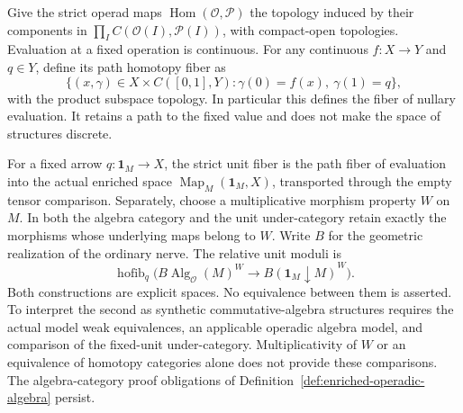 \begin{definition}
  \label{def:strict-operadic-structure-space}
  \leanok
  Give the strict operad maps $\operatorname{Hom}(\mathcal O,\mathcal P)$
  the topology induced by their components in
  $\prod_I C(\mathcal O(I),\mathcal P(I))$, with compact-open topologies.
  Evaluation at a fixed operation is continuous. For any continuous
  $f:X\to Y$ and $q\in Y$, define its path homotopy fiber as
  \[
    \{(x,\gamma)\in X\times C([0,1],Y):
       \gamma(0)=f(x),\ \gamma(1)=q\},
  \]
  with the product subspace topology. In particular this defines the
  fiber of nullary evaluation. It retains a path to the fixed value and
  does not make the space of structures discrete.
\end{definition}

\begin{definition}
  \label{def:operadic-unit-spaces}
  For a fixed arrow $q:\mathbf1_M\to X$, the strict unit fiber is the
  path fiber of evaluation into the actual enriched space
  $\operatorname{Map}_M(\mathbf1_M,X)$, transported through the empty
  tensor comparison.
  Separately, choose a multiplicative morphism property $W$ on $M$.
  In both the algebra category and the unit under-category retain exactly
  the morphisms whose underlying maps belong to $W$. Write $B$ for the
  geometric realization of the ordinary nerve. The relative unit moduli is
  \[
    \operatorname{hofib}_{q}\bigl(
      B\operatorname{Alg}_{\mathcal O}(M)^W\longrightarrow
      B(\mathbf1_M\downarrow M)^W\bigr).
  \]
  Both constructions are explicit spaces. No equivalence between them is
  asserted. To interpret the second as synthetic commutative-algebra
  structures requires the actual model weak equivalences, an applicable
  operadic algebra model, and comparison of the fixed-unit under-category.
  Multiplicativity of $W$ or an equivalence of homotopy categories alone
  does not provide these comparisons. The algebra-category proof
  obligations of Definition~\ref{def:enriched-operadic-algebra} persist.
\end{definition}

